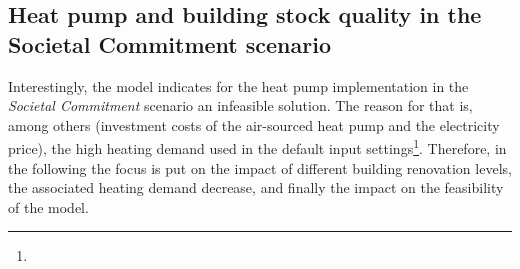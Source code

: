 \subsection{Heat pump and building stock quality in the Societal Commitment scenario}\label{res:heat_pump}
Interestingly, the model indicates for the heat pump implementation in the \textit{Societal Commitment} scenario an infeasible solution. The reason for that is, among others (investment costs of the air-sourced heat pump and the electricity price), the high heating demand used in the default input settings\footnote{}. Therefore, in the following the focus is put on the impact of different building renovation levels, the associated heating demand decrease, and finally the impact on the feasibility of the model.\vspace{0.5cm} 

